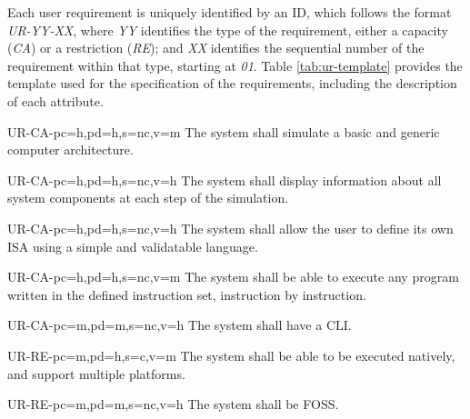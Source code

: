Each user requirement is uniquely identified by an ID, which follows the format \textit{UR-YY-XX}, where \textit{YY} identifies the type of the requirement, either a capacity (\textit{CA}) or a restriction (\textit{RE}); and \textit{XX} identifies the sequential number of the requirement within that type, starting at \textit{01}. Table \ref{tab:ur-template} provides the template used for the specification of the requirements, including the description of each attribute.




\setcounter{i}{1}

\begin{userReq}{UR-CA-}{pc=h,pd=h,s=nc,v=m}
  The system shall simulate a basic and generic computer architecture.
\end{userReq}

\begin{userReq}{UR-CA-}{pc=h,pd=h,s=nc,v=h}
  The system shall display information about all system components at each step of the simulation.
\end{userReq}

\begin{userReq}{UR-CA-}{pc=h,pd=h,s=nc,v=h}
  The system shall allow the user to define its own \gls{ISA} using a simple and validatable language.
\end{userReq}

\begin{userReq}{UR-CA-}{pc=h,pd=h,s=nc,v=m}
  The system shall be able to execute any program written in the defined instruction set, instruction by instruction.
\end{userReq}

\begin{userReq}{UR-CA-}{pc=m,pd=m,s=nc,v=h}
  The system shall have a \gls{CLI}.
\end{userReq}


\setcounter{i}{1}

\begin{userReq}{UR-RE-}{pc=m,pd=h,s=c,v=m}
  The system shall be able to be executed natively, and support multiple platforms.
\end{userReq}

\begin{userReq}{UR-RE-}{pc=m,pd=m,s=nc,v=h}
  The system shall be \gls{FOSS}.
\end{userReq}

